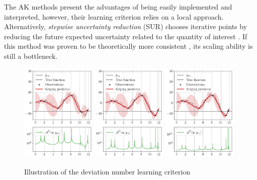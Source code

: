 The AK methods present the advantages of being easily implemented and interpreted, however, their learning criterion relies on a local approach. 
Alternatively, \textit{stepwise uncertainty reduction} (SUR) chooses iterative points by reducing the future expected uncertainty related to the quantity of interest \citep{bect_ginsbourger_2012}. 
If this method was proven to be theoretically more consistent \citep{bect_ginsbourger_2019}, its scaling ability is still a bottleneck.  

\begin{figure}[ht]
    \centering
    \includegraphics[width=0.32\textwidth]{../numerical_experiments/chapter1/figures/contour_find_0.png}
    \includegraphics[width=0.32\textwidth]{../numerical_experiments/chapter1/figures/contour_find_1.png}
    \includegraphics[width=0.32\textwidth]{../numerical_experiments/chapter1/figures/contour_find_2.png}
    \caption{Illustration of the deviation number learning criterion}
    \label{fig:AK_1D}
\end{figure}


